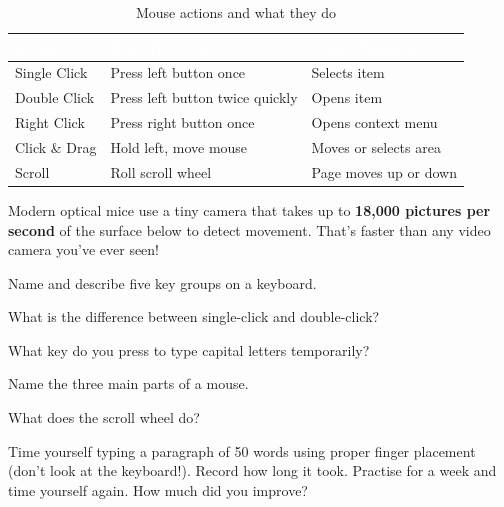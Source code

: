 \begin{table}[H]
\centering
\caption{Mouse actions and what they do}
\label{tab:mouse-actions}
\renewcommand{\arraystretch}{1.3}
\begin{tabularx}{\textwidth}{l X X}
\toprule
\rowcolor{HeaderRow}
\textcolor{white}{\textbf{Action}} & \textcolor{white}{\textbf{How To Do It}} & \textcolor{white}{\textbf{What Happens}} \\
\midrule
\rowcolor{RowLight} Single Click & Press left button once & Selects item \\
\rowcolor{RowDark} Double Click & Press left button twice quickly & Opens item \\
\rowcolor{RowLight} Right Click & Press right button once & Opens context menu \\
\rowcolor{RowDark} Click \& Drag & Hold left, move mouse & Moves or selects area \\
\rowcolor{RowLight} Scroll & Roll scroll wheel & Page moves up or down \\
\bottomrule
\end{tabularx}
\end{table}


\begin{funfact}
Modern optical mice use a tiny camera that takes up to \textbf{18,000 pictures per second} of the surface below to detect movement. That's faster than any video camera you've ever seen!
\end{funfact}

\begin{reviewqs}
  \item Name and describe five key groups on a keyboard.
  \item What is the difference between single-click and double-click?
  \item What key do you press to type capital letters temporarily?
  \item Name the three main parts of a mouse.
  \item What does the scroll wheel do?
\end{reviewqs}

\begin{challenge}
Time yourself typing a paragraph of 50 words using proper finger placement (don't look at the keyboard!). Record how long it took. Practise for a week and time yourself again. How much did you improve?
\end{challenge}
